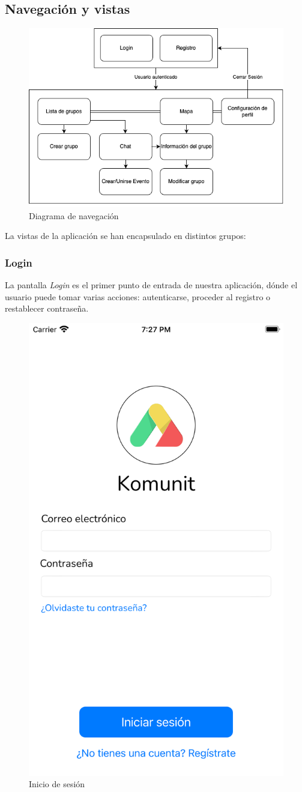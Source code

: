 \subsection{Navegación y vistas}
\begin{figure}[H]
        \centering
        \includegraphics[width=1\linewidth]{images/diagramaNavegacion (1).png}
        \caption{Diagrama de navegación}
        \label{fig:diagramaER}
\end{figure}
La vistas de la aplicación se han encapsulado en distintos grupos:

\subsubsection{Login}
La pantalla \textit{Login} es el primer punto de entrada de nuestra aplicación, dónde el usuario puede tomar varias acciones: autenticarse, proceder al registro o restablecer contraseña.

\begin{figure}[H]
        \centering
        \includegraphics[cframe=black 2pt,width=0.3\linewidth]{images/manual/login.png}
        \caption{Inicio de sesión}
        \label{fig:Vista Inicio de Sesión}
\end{figure}


